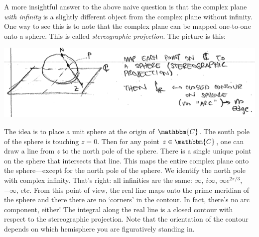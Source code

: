 \documentclass[
  11pt,
	colorful,
	raggedright,
]{tufte-style-thesis-flip}
\begin{document}
A more insightful answer to the above naive question is that the complex plane \emph{with infinity} is a slightly different object from the complex plane without infinity. One way to see this is to note that the complex plane can be mapped one-to-one onto a sphere. This is called \emph{stereographic projection}. The picture is this:
\begin{center}
\includegraphics[width=.9\textwidth]{figures/Lec_2017_stereographic.png}
\end{center}
The idea is to place a unit sphere at the origin of $\mathbbm{C}$. The south pole of the sphere is touching $z=0$. Then for any point $z\in\mathbbm{C}$, one can draw a line from $z$ to the north pole of the sphere. There is a single unique point on the sphere that intersects that line. This maps the entire complex plane onto the sphere---except for the north pole of the sphere. We identify the north pole with complex infinity. That's right: all infinities are the same: $\infty$, $i\infty$, $\infty e^{2\pi/3}$, $-\infty$, etc. From this point of view, the real line maps onto the prime meridian of the sphere and there there are no `corners' in the contour. In fact, there's no arc component, either! The integral along the real line is a closed contour with respect to the stereographic projection. Note that the orientation of the contour depends on which hemisphere you are figuratively standing in.
\end{document}
